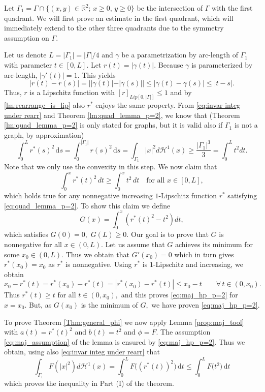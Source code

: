 \documentclass[10pt,leqno]{amsart}
\makeatletter
\newcommand{\R}[0]{\mathbb{R}}
\newcommand{\dd}{\, \mathrm{d}}
\numberwithin{Theorem}{section}
\theoremstyle{definition}
\theoremstyle{remark}
\numberwithin{equation}{section}
\numberwithin{equation}{section}
\newenvironment{customproof}[1]{%
  \par\pushQED{\qed}%
  \normalfont\topsep6pt \trivlist
  \item[\hskip\labelsep\itshape
    Proof of #1\@addpunct{.}]\ignorespaces
}{%
  \popQED\endtrivlist\@endpefalse
}
\makeatother
\begin{document}
\begin{customproof}{Theorem \ref{Thm:general_phi}}
Let $\Gamma_1=\Gamma\cap \{(x,y)\in\R^2;\, x\geq 0,\,y\geq 0\}$ be the intersection of $\Gamma$ with the first quadrant. We will first prove an estimate in the first quadrant, which will immediately extend to the other three quadrants due to the symmetry assumption on $\Gamma.$

    Let us denote $L=|\Gamma_1|=|\Gamma|/4$ and $\gamma$ be a parametrization by arc-length of $\Gamma_1$ with parameter $t \in [0, L]$.
Let $r(t) = |\gamma(t)|$. Because $\gamma$ is parameterized by arc-length, $|\gamma'(t)| = 1$.
This yields
$$ |r(t) - r(s)| = ||\gamma(t)| - |\gamma(s)|| \le |\gamma(t) - \gamma(s)| \le |t - s|. $$
Thus, $r$ is a Lipschitz function with $[r]_{Lip[0,|\Gamma|]}\leq 1$ and by \eqref{lm:rearrange_is_lip} also $r^*$ enjoys the same property.
From \eqref{eq:invar integ under rearr} and Theorem \ref{lm:quad_lemma_p=2}, we know that (Theorem \ref{lm:quad_lemma_p=2} is only stated for graphs, but it is valid also if $\Gamma_1$ is not a graph, by approximation)
\begin{equation} \label{eq:quad_lemma_p=2}
    \int_0^{L} r^*(s)^2 \dd s=\int_0^{|\Gamma_1|} r(s)^2 \dd s
    =\int_{\Gamma_1}|x|^2 d\mathcal{H}^1(x)\geq \frac{|\Gamma_1|^3}{3}
    =\int_0^{L}t^2 dt.
\end{equation}
Note that we only use the convexity in this step. 
We now claim that
\begin{equation} \label{eq:maj_hp_p=2}
\int_0^x r^*(t)^2 \, dt \ge \int_0^x t^2 \, dt \quad \text{for all }x \in [0,L],
\end{equation}
which holds true for any nonnegative increasing $1$-Lipschitz function $r^*$ satisfying \eqref{eq:quad_lemma_p=2}. To show this claim we define
$$
  G(x)=\int_0^x \left(r^*(t)^2-t^2\right)dt,
$$
which satisfies $G(0)=0,$ $G(L)\geq 0$. Our goal is to  prove that $G$ is nonnegative for all $x\in(0,L)$. Let us assume that $G$ achieves its minimum for some $x_0\in (0,L)$. Thus we obtain that $G'(x_0)=0$ which in turn gives $r^*(x_0)=x_0$ as $r^*$ is nonnegative. Using $r^*$ is $1$-Lipschitz and increasing, we obtain
$$
  x_0-r^*(t)=r^*(x_0)-r^*(t)=|r^*(x_0)-r^*(t)|\leq x_0-t\qquad\forall\,t\in (0,x_0).
$$
Thus $r^*(t)\geq t$ for all $t\in (0,x_0),$ and this proves \eqref{eq:maj_hp_p=2} for $x=x_0.$ But, as $G(x_0)$ is the minimum of $G,$ we have proven \eqref{eq:maj_hp_p=2}. 


To prove Theorem \ref{Thm:general_phi} we now apply Lemma \ref{prop:maj_tool} with 
$a(t)=r^*(t)^2$ and $b(t)=t^2$ and $\phi=F.$ 
The assumption \eqref{eq:maj_assumption} of the lemma is ensured by \eqref{eq:maj_hp_p=2}. Thus we obtain, using also \eqref{eq:invar integ under rearr} that
$$
  \int_{\Gamma_1}F(|x|^2)d\mathcal{H}^1(x)=\int_0^L F\big((r^*(t))^2\big)\dd t\leq 
  \int_0^L F\big(t^2\big)\dd t
$$
which proves the inequality in Part (I) of  the theorem. 


\end{customproof}
\end{document}
